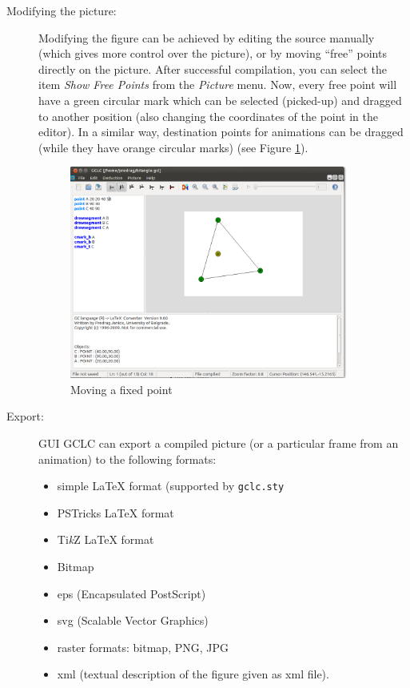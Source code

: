 \documentclass[a4paper]{book}
\begin{document}
\begin{description}
\item[Modifying the picture:] Modifying the figure can be achieved by 
editing the source manually (which gives more control over the picture),
or by moving ``free'' points directly on the picture. After successful 
compilation, you can select the item {\it Show Free Points} from the 
{\it Picture} menu. Now, every free point will have a green circular
mark which can be selected (picked-up) and dragged to another position
(also changing the coordinates of the point in the editor).
In a similar way, destination points for animations can be dragged 
(while they have orange circular marks) (see Figure \ref{fig:selectedpoints}).

\begin{figure}[h]
\begin{center}
\includegraphics[width=0.9\textwidth]{figures/freePoints2.png}
\end{center}
\caption{Moving a fixed point}
\label{fig:selectedpoints}
\end{figure}

\item[Export:] GUI GCLC can export a compiled picture (or a particular
frame from an animation) to the following formats:
\begin{itemize}
    \item simple \LaTeX{} format (supported by \verb|gclc.sty|
    \item PSTricks \LaTeX{} format
    \item Ti{\em k}Z \LaTeX{} format
    \item Bitmap
    \item {\sc eps} (Encapsulated PostScript)
    \item {\sc svg} (Scalable Vector Graphics)
    \item raster formats: bitmap, PNG, JPG
    \item {\sc xml} (textual description of the figure given as {\sc xml} file).
\end{itemize}


\end{description}
\end{document}
